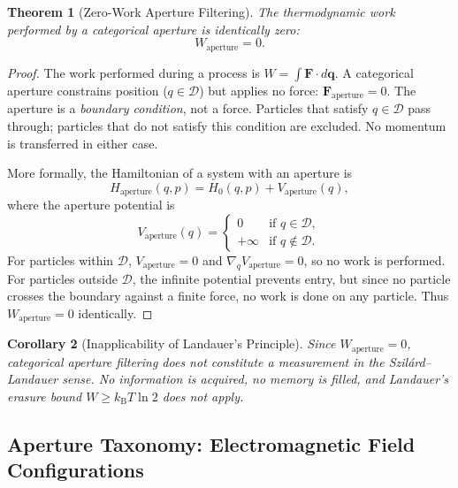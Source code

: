 \documentclass[twocolumn,10pt]{article}
\newtheorem{theorem}{Theorem}[section]
\newtheorem{corollary}[theorem]{Corollary}
\newcommand{\kB}{k_{\mathrm{B}}}
\begin{document}
\begin{theorem}[Zero-Work Aperture Filtering]
\label{thm:zero_work}
The thermodynamic work performed by a categorical aperture is identically zero:
\begin{equation}
  W_{\mathrm{aperture}} = 0.
  \label{eq:zero_work}
\end{equation}
\end{theorem}

\begin{proof}
The work performed during a process is $W = \int \mathbf{F} \cdot d\mathbf{q}$.  A categorical aperture constrains position ($q \in \mathcal{D}$) but applies no force: $\mathbf{F}_{\mathrm{aperture}} = 0$.  The aperture is a \emph{boundary condition}, not a force.  Particles that satisfy $q \in \mathcal{D}$ pass through; particles that do not satisfy this condition are excluded.  No momentum is transferred in either case.

More formally, the Hamiltonian of a system with an aperture is
\begin{equation}
  H_{\mathrm{aperture}}(q, p) = H_{0}(q, p) + V_{\mathrm{aperture}}(q),
\end{equation}
where the aperture potential is
\begin{equation}
  V_{\mathrm{aperture}}(q) =
  \begin{cases}
    0 & \text{if } q \in \mathcal{D}, \\
    +\infty & \text{if } q \notin \mathcal{D}.
  \end{cases}
\end{equation}
For particles within $\mathcal{D}$, $V_{\mathrm{aperture}} = 0$ and $\nabla_{q} V_{\mathrm{aperture}} = 0$, so no work is performed.  For particles outside $\mathcal{D}$, the infinite potential prevents entry, but since no particle crosses the boundary against a finite force, no work is done on any particle.  Thus $W_{\mathrm{aperture}} = 0$ identically.
\end{proof}

\begin{corollary}[Inapplicability of Landauer's Principle]
\label{cor:landauer}
Since $W_{\mathrm{aperture}} = 0$, categorical aperture filtering does not constitute a measurement in the Szil\'ard--Landauer sense.  No information is acquired, no memory is filled, and Landauer's erasure bound $W \geq \kB T \ln 2$ does not apply.
\end{corollary}

\subsection{Aperture Taxonomy: Electromagnetic Field Configurations}
\end{document}
